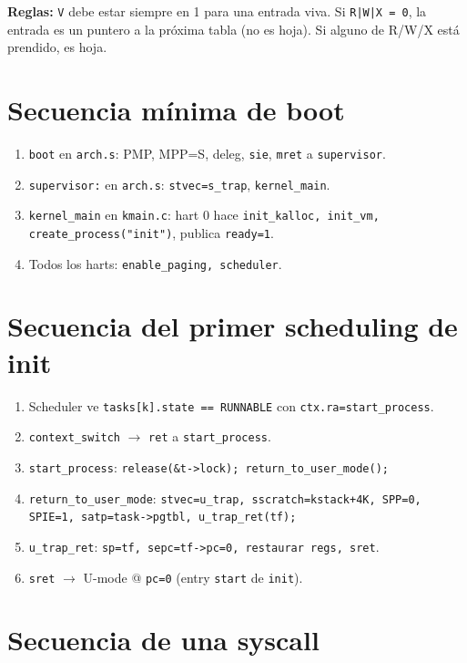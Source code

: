 \documentclass[11pt,a4paper]{article}
\begin{document}
\textbf{Reglas:} \texttt{V} debe estar siempre en 1 para una entrada
viva. Si \texttt{R|W|X = 0}, la entrada es un puntero a la próxima
tabla (no es hoja). Si alguno de R/W/X está prendido, es hoja.

\section{Secuencia mínima de boot}

\begin{enumerate}[leftmargin=*,nosep]
    \item \texttt{boot} en \texttt{arch.s}: PMP, MPP=S, deleg,
        \texttt{sie}, \texttt{mret} a \texttt{supervisor}.
    \item \texttt{supervisor:} en \texttt{arch.s}: \texttt{stvec=s\_trap},
        \texttt{kernel\_main}.
    \item \texttt{kernel\_main} en \texttt{kmain.c}: hart 0 hace
        \texttt{init\_kalloc, init\_vm, create\_process("init")},
        publica \texttt{ready=1}.
    \item Todos los harts: \texttt{enable\_paging, scheduler}.
\end{enumerate}

\section{Secuencia del primer scheduling de init}

\begin{enumerate}[leftmargin=*,nosep]
    \item Scheduler ve \texttt{tasks[k].state == RUNNABLE} con
        \texttt{ctx.ra=start\_process}.
    \item \texttt{context\_switch} $\to$ \texttt{ret} a
        \texttt{start\_process}.
    \item \texttt{start\_process}: \texttt{release(\&t->lock); return\_to\_user\_mode();}
    \item \texttt{return\_to\_user\_mode}: \texttt{stvec=u\_trap,
        sscratch=kstack+4K, SPP=0, SPIE=1, satp=task->pgtbl,
        u\_trap\_ret(tf);}
    \item \texttt{u\_trap\_ret}: \texttt{sp=tf, sepc=tf->pc=0,
        restaurar regs, sret}.
    \item \texttt{sret} $\to$ U-mode @ \texttt{pc=0} (entry
        \texttt{start} de \texttt{init}).
\end{enumerate}

\section{Secuencia de una syscall}
\end{document}
